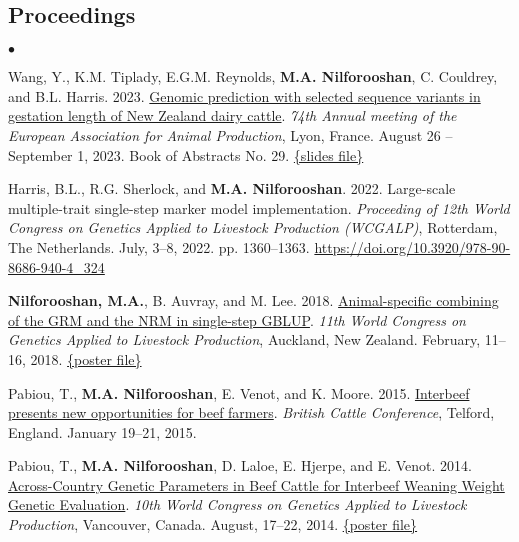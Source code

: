 \documentclass[margin,line]{res}
\newenvironment{list2}{
  \begin{list}{$\bullet$}{%
      \setlength{\itemsep}{0in}
      \setlength{\parsep}{0in} \setlength{\parskip}{0in}
      \setlength{\topsep}{0in} \setlength{\partopsep}{0in}
      \setlength{\leftmargin}{0.2in}}}{\end{list}}
\begin{document}
\begin{resume}
  \section{\sc Proceedings}

  \begin{list2}
    \item Wang, Y., K.M. Tiplady, E.G.M. Reynolds, {\bf M.A. Nilforooshan}, C. Couldrey, and B.L. Harris. 2023. \href{https://drive.google.com/file/d/17ExrxN3UtOX0vTlLfaMWlFZFQsiIqMQ6/view?usp=sharing}{Genomic prediction with selected sequence variants in gestation length of New Zealand dairy cattle}. {\em 74th Annual meeting of the European Association for Animal Production}, Lyon, France. August 26 -- September 1, 2023. Book of Abstracts No. 29. \href{https://interbull.org/static/web/WANG_Y_20230828_0830_Tete_d_or_Lounge.pdf}{\{slides file\}}
    \item Harris, B.L., R.G. Sherlock, and {\bf M.A. Nilforooshan}. 2022. Large-scale multiple-trait single-step marker model implementation. {\em Proceeding of 12th World Congress on Genetics Applied to Livestock Production (WCGALP)}, Rotterdam, The Netherlands. July, 3--8, 2022. pp. 1360--1363. \url{https://doi.org/10.3920/978-90-8686-940-4_324}
    \item {\bf Nilforooshan, M.A.}, B. Auvray, and M. Lee. 2018. \href{https://www.researchgate.net/publication/358198782_Animal-specific_combining_of_the_GRM_and_the_NRM_in_single-step_GBLUP}{Animal-specific combining of the GRM and the NRM in single-step GBLUP}. {\em 11th World Congress on Genetics Applied to Livestock Production}, Auckland, New Zealand. February, 11--16, 2018. \href{https://doi.org/10.13140/RG.2.2.25768.03843}{\{poster file\}}
    \item Pabiou, T., {\bf M.A. Nilforooshan}, E. Venot, and  K. Moore. 2015. \href{https://www.researchgate.net/publication/358198790_Interbeef_presents_new_opportunities_for_beef_farmers}{Interbeef presents new opportunities for beef farmers}. {\em British Cattle Conference}, Telford, England. January 19--21, 2015.
    \item Pabiou, T., {\bf M.A. Nilforooshan}, D. Laloe, E. Hjerpe, and E. Venot. 2014. \href{https://www.researchgate.net/publication/268110020_ACROSS-COUNTRY_GENETIC_PARAMETERS_IN_BEEF_CATTLE_FOR_INTERBEEF_WEANING_WEIGHT_GENETIC_EVALUATION}{Across-Country Genetic Parameters in Beef Cattle for Interbeef Weaning Weight Genetic Evaluation}. {\em 10th World Congress on Genetics Applied to Livestock Production}, Vancouver, Canada. August, 17--22, 2014. \href{http://dx.doi.org/10.13140/RG.2.2.33036.80003}{\{poster file\}}

\end{list2}
\end{resume}
\end{document}
